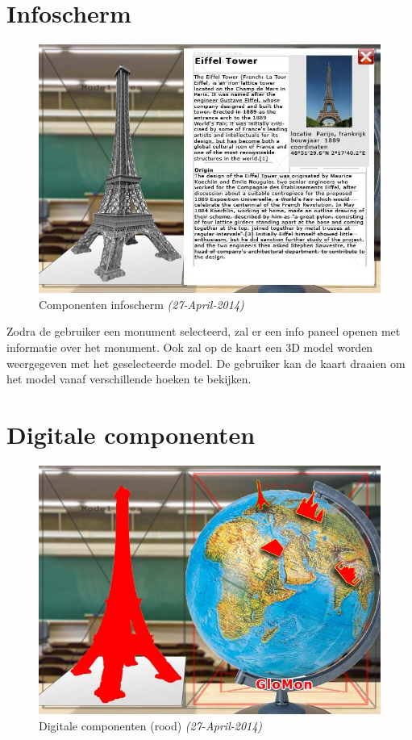 \section{Infoscherm} \label{sec:infoscherm}
\begin{figure}[h]
  \includegraphics[width=130mm]{figs/components2a.jpg}
  \caption{Componenten infoscherm \textit{(27-April-2014)}}
  \label{fig:components2}
\end{figure}
Zodra de gebruiker een monument selecteerd, zal er een info paneel openen met informatie over het monument. Ook zal op de kaart een 3D model worden weergegeven met het geselecteerde model. De gebruiker kan de kaart draaien om het model vanaf verschillende hoeken te bekijken.

\newpage
\section{Digitale componenten} \label{sec:digicomponents}
\begin{figure}[h]
  \includegraphics[width=130mm]{figs/components4a.jpg}
  \caption{Digitale componenten (rood) \textit{(27-April-2014)}}
  \label{fig:digitals}
\end{figure}

